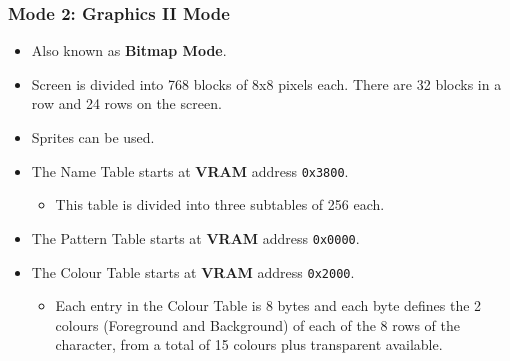         \subsubsection{Mode 2: \textbf{Graphics II Mode}}
        \begin{itemize}
            \item Also known as \textbf{Bitmap Mode}.
            \item Screen is divided into 768 blocks of 8x8 pixels each. There
            are 32 blocks in a row and 24 rows on the screen.
            \item Sprites can be used.
            \item The Name Table starts at \textbf{VRAM} address \texttt{0x3800}.
            \begin{itemize}
                \item This table is divided into three subtables of 256 each.
            \end{itemize}
            \item The Pattern Table starts at \textbf{VRAM} address \texttt{0x0000}.
            \item The Colour Table starts at \textbf{VRAM} address \texttt{0x2000}.
            \begin{itemize}
                \item Each entry in the Colour Table is 8 bytes and each byte
                    defines the 2 colours (Foreground and Background) of each 
                    of the 8 rows of the character, from a total of 15 colours
                    plus transparent available.
            \end{itemize}
        \end{itemize}

